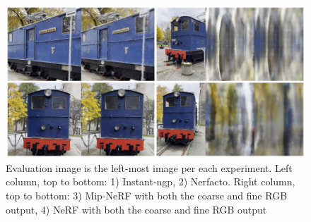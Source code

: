 \begin{figure}[h]
    \centering
    \includegraphics[width=1.0\textwidth]{figures/ohma-electra-result.png}
    \caption{Evaluation image is the left-most image per each experiment.
    Left column, top to bottom: 1) Instant-ngp, 2) Nerfacto. Right column, top to bottom: 3) Mip-NeRF with both the coarse and fine RGB output, 4) NeRF with both the coarse and fine RGB output}
    \label{fig:ohma-electra-result}
\end{figure}